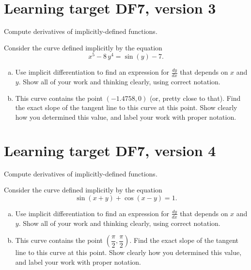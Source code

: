 \pagebreak

\section{Learning target DF7, version 3}

Compute derivatives of implicitly-defined functions.

\hrulefill

Consider the curve defined implicitly by the equation
\[x^5 - 8\, y^4 = \sin\left(y\right) - 7.\]

\begin{enumerate}[(a)]
	\item Use implicit differentiation to find an expression for $\frac{dy}{dx}$ that depends on $x$ and $y$.  Show all of your work and thinking clearly, using correct notation.

	\vfill

	\item This curve contains the point \((-1.4758, 0)\) (or, pretty close to that). Find the exact slope of the tangent line to this curve at this point. Show clearly how you determined this value, and label your work with proper notation.

	\vfill
\end{enumerate}

\pagebreak

\section{Learning target DF7, version 4}

Compute derivatives of implicitly-defined functions.

\hrulefill

Consider the curve defined implicitly by the equation
\[\sin(x+y) + \cos(x-y) = 1.\]

\begin{enumerate}[(a)]
	\item Use implicit differentiation to find an expression for $\frac{dy}{dx}$ that depends on $x$ and $y$.  Show all of your work and thinking clearly, using correct notation.

	\vfill

	\item This curve contains the point \(\left(\dfrac\pi{2},\dfrac\pi{2}\right)\). Find the exact slope of the tangent line to this curve at this point. Show clearly how you determined this value, and label your work with proper notation.

	\vfill
\end{enumerate}

